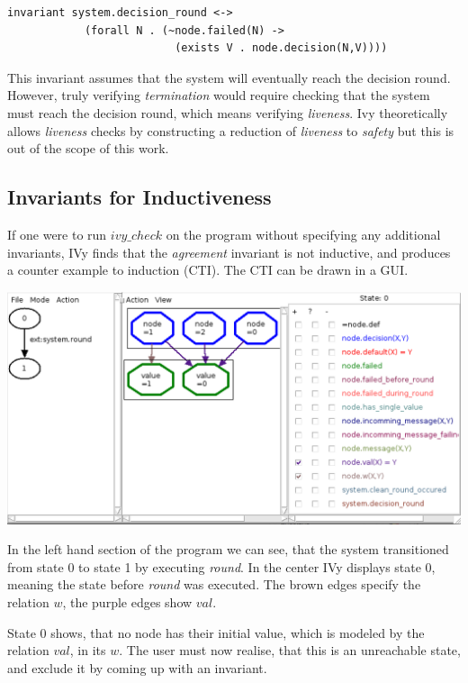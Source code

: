 \documentclass[fleqn]{article}
\begin{document}
\begin{mdframed}[nobreak=true, backgroundcolor=light-gray, roundcorner=10pt,leftmargin=1, rightmargin=1, innerleftmargin=15, innertopmargin=15,innerbottommargin=15, outerlinewidth=1, linecolor=light-gray]
\begin{lstlisting}
invariant system.decision_round <->
            (forall N . (~node.failed(N) ->
                          (exists V . node.decision(N,V))))
\end{lstlisting}
\end{mdframed}
This invariant assumes that the system will eventually reach the decision round. However, truly verifying \textit{termination} would require checking that the system must reach the decision round, which means verifying  \textit{liveness}. Ivy theoretically allows \textit{liveness} checks by constructing a reduction of \textit{liveness} to \textit{safety} \cite{live} but this is out of the scope of this work.

\subsection{Invariants for Inductiveness}
If one were to run $ivy\_check$ on the program without specifying any
additional invariants, IVy finds that the \textit{agreement} invariant is not inductive,
and produces a counter example to induction (CTI). The CTI can be drawn in a GUI.

\noindent\includegraphics[width=\textwidth]{gui.png}

\noindent In the left hand section of the program we can see, that the system transitioned from state 0
to state 1 by executing \textit{round}. In the center IVy displays state 0, meaning the state
before \textit{round} was executed. The brown edges specify the relation $w$, the purple edges
show $val$.

State 0 shows, that no node has their initial value, which is modeled by the relation $val$,
in its $w$. The user must now realise, that this is an unreachable state, and exclude it by coming
up with an invariant.
\end{document}
